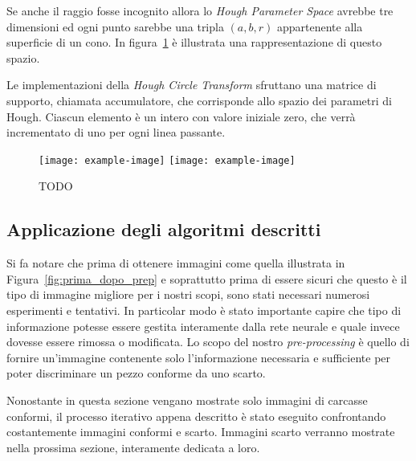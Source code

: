 Se anche il raggio fosse incognito allora lo \textit{Hough Parameter Space} avrebbe tre dimensioni ed ogni punto sarebbe una tripla $(a,b,r)$ appartenente alla superficie di un cono.
In figura~\ref{fig:hough_parametr_3d} è illustrata una rappresentazione di questo spazio.

Le implementazioni della \textit{Hough Circle Transform} sfruttano una matrice di supporto, chiamata accumulatore, che corrisponde allo spazio dei parametri di Hough.
Ciascun elemento è un intero con valore iniziale zero, che verrà incrementato di uno per ogni linea passante.

\begin{figure}[ht] %
  \begin{center}
    \texttt{[image: example-image]}
    \texttt{[image: example-image]}
    \caption{TODO }
    \label{fig:hough_parametr_3d}
  \end{center}
\end{figure}




\clearpage
\subsection {Applicazione degli algoritmi descritti}
Si fa notare che prima di ottenere immagini come quella illustrata in Figura~\ref{fig:prima_dopo_prep} e soprattutto prima di essere sicuri che questo è il tipo di immagine migliore per i nostri scopi, sono stati necessari numerosi esperimenti e tentativi.
In particolar modo è stato importante capire che tipo di informazione potesse essere gestita interamente dalla rete neurale e quale invece dovesse essere rimossa o modificata.
Lo scopo del nostro \textit{pre-processing} è quello di fornire un'immagine contenente solo l'informazione necessaria e sufficiente per poter discriminare un pezzo conforme da uno scarto.

Nonostante in questa sezione vengano mostrate solo immagini di carcasse conformi, il processo iterativo appena descritto è stato eseguito confrontando costantemente immagini conformi e scarto.
Immagini scarto verranno mostrate nella prossima sezione, interamente dedicata a loro.

